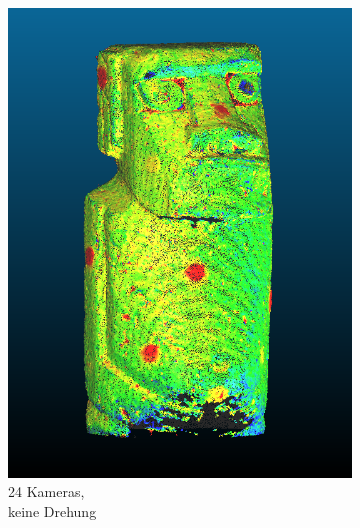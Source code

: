 \documentclass[./00PhotoBox.tex]{subfiles}
\begin{document}
\begin{figure}
    \centering
    \begin{subfigure}{0.24\textwidth}
        \includegraphics[width=1\linewidth]{img/cam_anzahl/normal.png}
        \centering
        \caption{24 Kameras,\\ keine Drehung} %
        \label{img:moai_normal} %
    \end{subfigure}
    \begin{subfigure}{0.24\textwidth}

\end{subfigure}
\end{figure}
\end{document}
